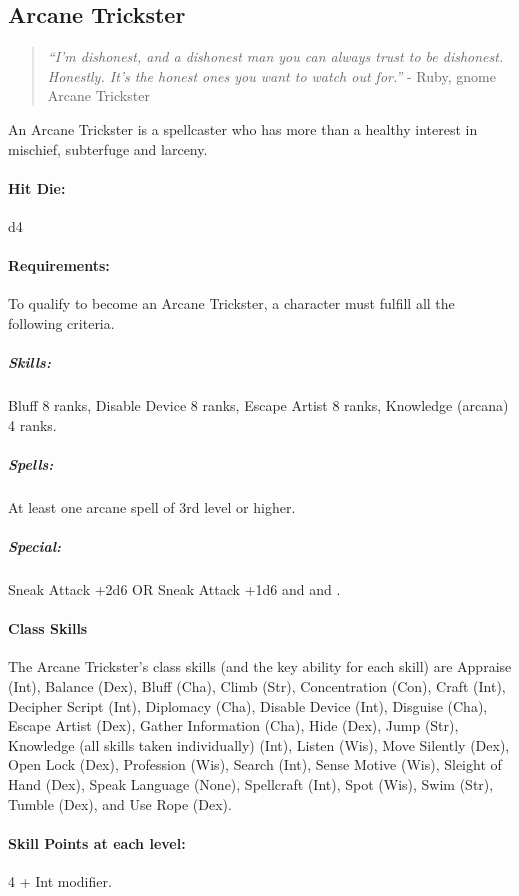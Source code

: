 \subsection{Arcane Trickster}
\begin{quote}
\emph{``I'm dishonest, and a dishonest man you can always trust to be dishonest. Honestly. It's the honest ones you want to watch out for.''}
- Ruby, gnome Arcane Trickster
\end{quote}
An Arcane Trickster is a spellcaster who has more than a healthy interest in mischief, subterfuge and larceny.
\paragraph{Hit Die:} d4
\paragraph{Requirements:}
To qualify to become an Arcane Trickster, a character must fulfill all the following criteria.
\subparagraph{Skills:} Bluff 8 ranks, Disable Device 8 ranks, Escape Artist 8 ranks, Knowledge (arcana) 4 ranks.
\subparagraph{Spells:} At least one arcane spell of 3rd level or higher.
\subparagraph{Special:} Sneak Attack +2d6 OR Sneak Attack +1d6 and  and .
\paragraph{Class Skills}
The Arcane Trickster's class skills (and the key ability for each skill) are Appraise (Int), Balance (Dex), Bluff (Cha), Climb (Str), Concentration (Con), Craft (Int), Decipher Script (Int), Diplomacy (Cha), Disable Device (Int), Disguise (Cha), Escape Artist (Dex), Gather Information (Cha), Hide (Dex), Jump (Str), Knowledge (all skills taken individually) (Int), Listen (Wis), Move Silently (Dex), Open Lock (Dex), Profession (Wis), Search (Int), Sense Motive (Wis), Sleight of Hand (Dex), Speak Language (None), Spellcraft (Int), Spot (Wis), Swim (Str), Tumble (Dex), and Use Rope (Dex).
\paragraph{Skill Points at each level:} 4 + Int modifier.

